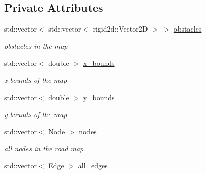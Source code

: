 \subsection*{Private Attributes}
\begin{DoxyCompactItemize}
\item 
\mbox{\label{classprm_1_1RoadMap_a5c4bd6165645faab938831e7890d077e}} 
std\+::vector$<$ std\+::vector$<$ rigid2d\+::\+Vector2D $>$ $>$ \hyperlink{classprm_1_1RoadMap_a5c4bd6165645faab938831e7890d077e}{obstacles}
\begin{DoxyCompactList}\small\item\em obstacles in the map \end{DoxyCompactList}\item 
\mbox{\label{classprm_1_1RoadMap_a2ad1a820114f8832cde28136385ab2d4}} 
std\+::vector$<$ double $>$ \hyperlink{classprm_1_1RoadMap_a2ad1a820114f8832cde28136385ab2d4}{x\+\_\+bounds}
\begin{DoxyCompactList}\small\item\em x bounds of the map \end{DoxyCompactList}\item 
\mbox{\label{classprm_1_1RoadMap_a74349888d97a0056b994aae47c0a4b07}} 
std\+::vector$<$ double $>$ \hyperlink{classprm_1_1RoadMap_a74349888d97a0056b994aae47c0a4b07}{y\+\_\+bounds}
\begin{DoxyCompactList}\small\item\em y bounds of the map \end{DoxyCompactList}\item 
\mbox{\label{classprm_1_1RoadMap_a5f13fcb691beb29fd4ef0b37b3c05c54}} 
std\+::vector$<$ \hyperlink{structprm_1_1Node}{Node} $>$ \hyperlink{classprm_1_1RoadMap_a5f13fcb691beb29fd4ef0b37b3c05c54}{nodes}
\begin{DoxyCompactList}\small\item\em all nodes in the road map \end{DoxyCompactList}\item 
\mbox{\label{classprm_1_1RoadMap_a05410db39631cd38cd76aaaa72325895}} 
std\+::vector$<$ \hyperlink{structprm_1_1Edge}{Edge} $>$ \hyperlink{classprm_1_1RoadMap_a05410db39631cd38cd76aaaa72325895}{all\+\_\+edges}

\end{DoxyCompactItemize}
